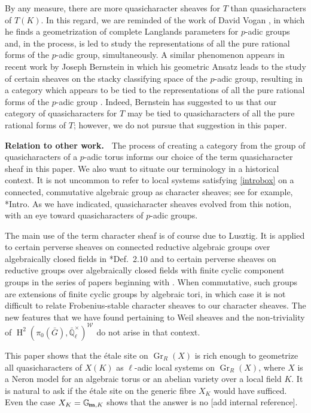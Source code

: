 \documentclass[10pt]{amsart}
\theoremstyle{plain}
\theoremstyle{definition}
\theoremstyle{remark}
\newcommand{\EE}{\mathbb{\bar Q}_\ell}
\newcommand{\EEx}{\EE^\times}
\newcommand{\Weil}[1]{\mathcal{W}_{#1}}
\newcommand{\Gm}[1]{\mathbb{G}_{\hskip-1pt\textbf{m},#1}}
\DeclareMathOperator{\Gr}{Gr}
\DeclareMathOperator{\Hh}{H}
\begin{document}
By any measure, there are more quasicharacter sheaves for $T$ than quasicharacters of $T(K)$.  
In this regard, we are reminded of the work of David Vogan \cite{vogan:93a}, in which he finds a geometrization of complete Langlands parameters for $p$-adic groups 
and, in the process, is led to study the representations of all the pure rational forms of the $p$-adic group, simultaneously.
A similar phenomenon appears in recent work by Joseph Bernstein in which his geometric Ansatz leads to the study of certain sheaves on the stacky classifying space of the $p$-adic group, resulting in a category which appears to be tied to the representations of all the pure rational forms of the $p$-adic group \cite{bernstein:vogan_conference}.
Indeed, Bernstein has suggested to us that our category of quasicharacters for $T$ may be tied to quasicharacters of all the pure rational forms of $T$; however, we do not pursue that suggestion in this paper.

\medskip
\noindent\textbf{Relation to other work.\ }
The process of creating a category from the group of quasicharacters of a $p$-adic  torus informs our choice of the term quasicharacter sheaf in this paper.
We also want to situate our terminology in a historical context.
It is not uncommon to refer to local systems satisfying \eqref{introbox} on a connected, commutative algebraic group as character sheaves;
see for example, \cite{kamgarpour:09a}*{Intro}.
As we have indicated, quasicharacter sheaves evolved from this notion,
with an eye toward quasicharacters of $p$-adic groups.

The main use of the term character sheaf is of course due to Lusztig.
It is applied to certain perverse sheaves on connected reductive algebraic groups over algebraically closed fields in
\cite{lusztig:85a}*{Def.~2.10} and to certain perverse sheaves on reductive groups
over algebraically closed fields with finite cyclic component groups in the series of papers
beginning with \cite{lusztig:disconnected1}.
When commutative, such groups are extensions of finite cyclic groups by algebraic tori,
in which case it is not difficult to relate Frobenius-stable character sheaves to our character sheaves.
The new features that we have found pertaining to Weil sheaves and the non-triviality of $\Hh^2(\pi_0({\bar G}),\EEx)^{\Weil{}}$ do not arise in that context.

This paper shows that the \'etale site on $\Gr_R(X)$ is rich enough to geometrize all quasicharacters of $X(K)$ as $\ell$-adic local systems on $\Gr_R(X)$, where $X$ is a Neron model for an algebraic torus or an abelian variety over a local field $K$. 
It is natural to ask if the \'etale site on the generic fibre $X_K$ would have sufficed. 
Even the case $X_K = \Gm{K}$ shows that the answer is no [add internal reference].
\end{document}
